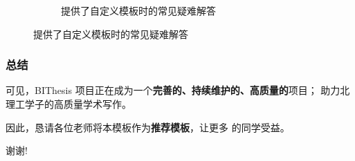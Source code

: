 \documentclass[
  aspectratio=169,
  presentation,
  titlegraphic=./images/bit.png,
  framelogo=./images/bit.png
]{bitbeamer}
\begin{document}
\begin{frame}
\begin{figure}
\begin{subfigure}{0.40\textwidth}
      \caption{提供了自定义模板时的常见疑难解答}
    \end{subfigure}
  \end{figure}
   
\end{frame}
\begin{frame}[c]
\frametitle{总结}

  可见，BIThesis 项目正在成为一个\textbf{完善的、持续维护的、高质量的}项目；
  助力北理工学子的高质量学术写作。

  因此，恳请各位老师将本模板作为\textbf{推荐模板}，让更多
  的同学受益。
  
  \vspace{8ex}
  谢谢!
  
\end{frame}
\end{document}
